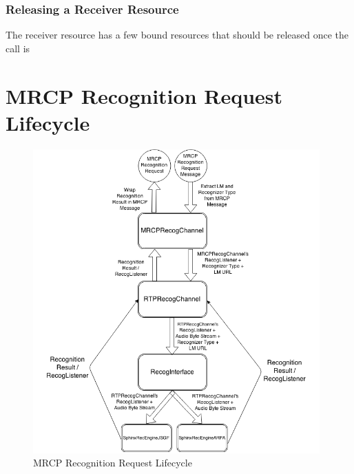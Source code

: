 \subsubsection{Releasing a Receiver Resource}
The receiver resource has a few bound resources that should be released once the call is 


\section{MRCP Recognition Request Lifecycle}

\begin{figure}[h]
  \centering
  \includegraphics[width=11cm]{resources/images/MRCP-Recognition-Request-Lifecycle.png}
  \caption{MRCP Recognition Request Lifecycle}
  \label{fig:mrcprecognitionrequestlifecycle}
\end{figure}

